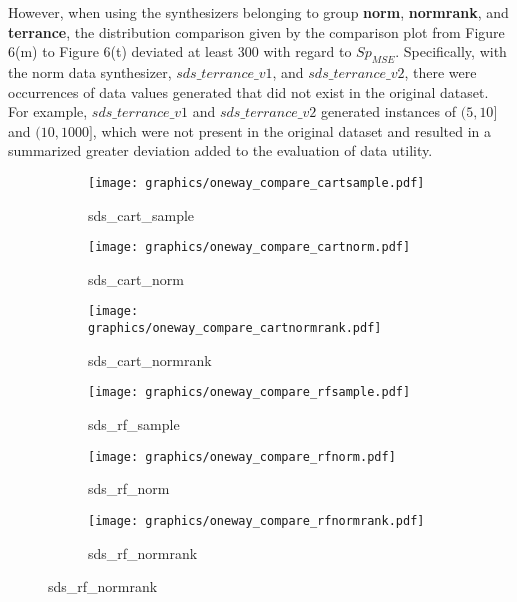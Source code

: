 However, when using the synthesizers belonging to group \textbf{norm}, \textbf{normrank}, and \textbf{terrance}, the distribution comparison given by the comparison plot from Figure 6(m) to Figure 6(t) deviated at least 300 with regard to $Sp_{MSE}$. Specifically, with the norm data synthesizer, $sds\_terrance\_v1$, and $sds\_terrance\_v2$, there were occurrences of data values generated that did not exist in the original dataset. For example, $sds\_terrance\_v1$ and $sds\_terrance\_v2$ generated instances of $(5, 10]$ and $(10, 1000]$, which were not present in the original dataset and resulted in a summarized greater deviation added to the evaluation of data utility.
\begin{figure}[H]
\centering
    \begin{subfigure}{0.32\textwidth}
        \centering
        \texttt{[image: graphics/oneway\_compare\_cartsample.pdf]}  
        \caption{sds\_cart\_sample}
        \label{subfig:cartsamplec2}
    \end{subfigure}
    \begin{subfigure}{0.32\textwidth}
        \centering
        \texttt{[image: graphics/oneway\_compare\_cartnorm.pdf]}  
        \caption{sds\_cart\_norm}
        \label{subfig:cartnormc2}
    \end{subfigure}
    \begin{subfigure}{0.32\textwidth}
        \centering
        \texttt{[image: graphics/oneway\_compare\_cartnormrank.pdf]}  
        \caption{sds\_cart\_normrank}
        \label{subfig:cartnormrankc2}
    \end{subfigure}
    \medskip
    \begin{subfigure}{0.32\textwidth}
        \centering
        \texttt{[image: graphics/oneway\_compare\_rfsample.pdf]}  
        \caption{sds\_rf\_sample}
        \label{subfig:rfsamplec2}
    \end{subfigure}
    \begin{subfigure}{0.32\textwidth}
        \centering
        \texttt{[image: graphics/oneway\_compare\_rfnorm.pdf]}  
        \caption{sds\_rf\_norm}
        \label{subfig:rfnormc2}
    \end{subfigure}
    \begin{subfigure}{0.32\textwidth}
        \centering
        \texttt{[image: graphics/oneway\_compare\_rfnormrank.pdf]}  
        \caption{sds\_rf\_normrank}

\end{subfigure}
\end{figure}

